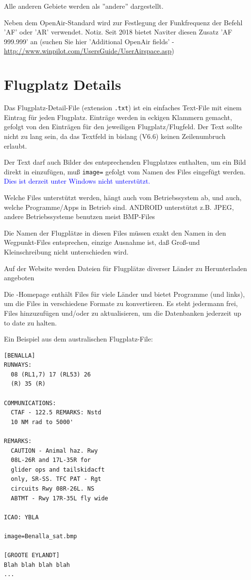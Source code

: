 Alle anderen Gebiete werden als ''andere'' dargestellt.

Neben dem OpenAir-Standard wird zur Festlegung der Funkfrequenz der Befehl 'AF' oder 'AR' verwendet.
Notiz. Seit 2018 bietet Naviter diesen Zusatz 'AF 999.999' an (suchen Sie hier 'Additional OpenAir fields' - \url{http://www.winpilot.com/UsersGuide/UserAirspace.asp})


\section{Flugplatz Details}\label{sec:airfield-details}

Das Flugplatz-Detail-File  (extension \verb|.txt|) ist ein einfaches Text-File mit einem Eintrag für jeden
Flugplatz. Einträge werden in eckigen Klammern gemacht, gefolgt von den Einträgen für den jeweiligen
Flugplatz/Flugfeld. Der Text sollte nicht zu lang sein, da das Textfeld in  \xc bislang (V6.6) keinen Zeilenumbruch
erlaubt.

Der Text darf auch Bilder des entsprechenden Flugplatzes enthalten, um ein Bild direkt in \xc einzufügen,
muß  \verb|image=| gefolgt vom Namen des Files eingefügt werden. \textcolor{blue}{Dies ist derzeit unter Windows nicht unterstützt.} 


Welche Files unterstützt werden, hängt auch vom Betriebssystem ab, und auch, welche Programme/Apps
in Betrieb sind. ANDROID unterstützt z.B.  JPEG, andere Betriebssysteme benutzen meist BMP-Files

Die Namen der Flugplätze in diesen Files müssen exakt den Namen in den Wegpunkt-Files entsprechen,
einzige Ausnahme ist, daß Groß-und Kleinschreibung nicht unterschieden wird.

Auf der \xc Website werden Dateien für Flugplätze diverser Länder zu Herunterladen angeboten


Die \xc-Homepage enthält Files für viele Länder und bietet Programme (und links), um die
Files in verschiedene Formate zu konvertieren.  Es steht jedermann frei, Files hinzuzufügen und/oder zu aktualisieren,
um die Datenbanken jederzeit up to date zu halten.

Ein Beispiel aus dem australischen Flugplatz-File:
\begin{verbatim}
[BENALLA]
RUNWAYS:
  08 (RL1,7) 17 (RL53) 26
  (R) 35 (R)

COMMUNICATIONS:
  CTAF - 122.5 REMARKS: Nstd
  10 NM rad to 5000'

REMARKS:
  CAUTION - Animal haz. Rwy
  08L-26R and 17L-35R for
  glider ops and tailskidacft
  only, SR-SS. TFC PAT - Rgt
  circuits Rwy 08R-26L. NS
  ABTMT - Rwy 17R-35L fly wide

ICAO: YBLA

image=Benalla_sat.bmp

[GROOTE EYLANDT]
Blah blah blah blah
...
\end{verbatim}


